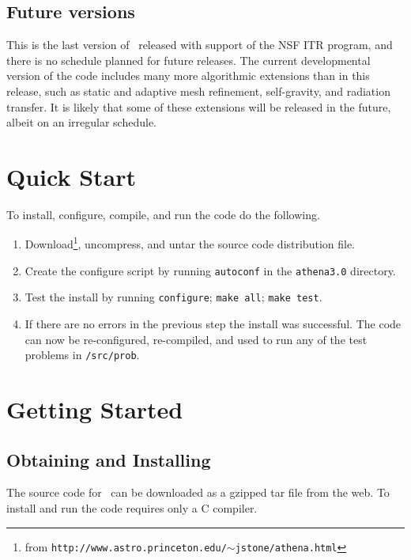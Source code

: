 \subsection{Future versions}

This is the last version of \ath\ released with support of the NSF
ITR program, and there is no schedule planned for future releases.
The current developmental version of the code includes many more
algorithmic extensions than in this release, such as static and
adaptive mesh refinement, self-gravity, and radiation transfer.
It is likely that some of these extensions will be released in the future,
albeit on an irregular schedule.

\section{Quick Start}

To install, configure, compile, and run the code do the following.
\begin{enumerate}

\item Download\footnote{from {\tt http://www.astro.princeton.edu/$\sim$jstone/athena.html}}, uncompress, and untar the source code distribution file.

\item Create the configure script by running {\tt autoconf} in the
{\tt athena3.0} directory.

\item Test the install by running {\tt configure}; {\tt make all};
{\tt make test}.

\item If there are no errors in the previous step the install was
successful.  The code can now be re-configured, re-compiled, and used to run any
of the test problems in {\tt /src/prob}.

\end{enumerate}

\section{Getting Started}

\subsection{Obtaining and Installing \ath}

The source code for \ath\ can be downloaded as a gzipped tar file from the
web\footnotemark[2].  To install and run the code requires only a C compiler.

